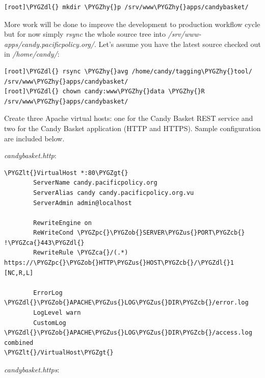 \documentclass[letterpaper,10pt,english]{sphinxmanual}
\def\PYGZus{\char`\_}
\def\PYGZob{\char`\{}
\def\PYGZcb{\char`\}}
\def\PYGZca{\char`\^}
\def\PYGZlt{\char`\<}
\def\PYGZgt{\char`\>}
\def\PYGZpc{\char`\%}
\def\PYGZdl{\char`\$}
\def\PYGZhy{\char`\-}
\begin{document}
\begin{Verbatim}[commandchars=\\\{\}]
[root]\PYGZdl{} mkdir \PYGZhy{}p /srv/www\PYGZhy{}apps/candybasket/
\end{Verbatim}

More work will be done to improve the development to production
workflow cycle but for now simply \emph{rsync} the whole source tree into
\emph{/srv/www-apps/candy.pacificpolicy.org/}. Let's assume you have the
latest source checked out in \emph{/home/candy/}:

\begin{Verbatim}[commandchars=\\\{\}]
[root]\PYGZdl{} rsync \PYGZhy{}avg /home/candy/tagging\PYGZhy{}tool/ /srv/www\PYGZhy{}apps/candybasket/
[root]\PYGZdl{} chown candy:www\PYGZhy{}data \PYGZhy{}R /srv/www\PYGZhy{}apps/candybasket/
\end{Verbatim}

Create three Apache virtual hosts: one for the Candy Basket REST
service and two for the Candy Basket application (HTTP and
HTTPS). Sample configuration are included below.

\emph{candybasket.http}:

\begin{Verbatim}[commandchars=\\\{\}]
\PYGZlt{}VirtualHost *:80\PYGZgt{}
        ServerName candy.pacificpolicy.org
        ServerAlias candy candy.pacificpolicy.org.vu
        ServerAdmin admin@localhost

        RewriteEngine on
        ReWriteCond \PYGZpc{}\PYGZob{}SERVER\PYGZus{}PORT\PYGZcb{} !\PYGZca{}443\PYGZdl{}
        RewriteRule \PYGZca{}/(.*) https://\PYGZpc{}\PYGZob{}HTTP\PYGZus{}HOST\PYGZcb{}/\PYGZdl{}1 [NC,R,L]

        ErrorLog \PYGZdl{}\PYGZob{}APACHE\PYGZus{}LOG\PYGZus{}DIR\PYGZcb{}/error.log
        LogLevel warn
        CustomLog \PYGZdl{}\PYGZob{}APACHE\PYGZus{}LOG\PYGZus{}DIR\PYGZcb{}/access.log combined
\PYGZlt{}/VirtualHost\PYGZgt{}
\end{Verbatim}

\emph{candybasket.https}:
\end{document}
